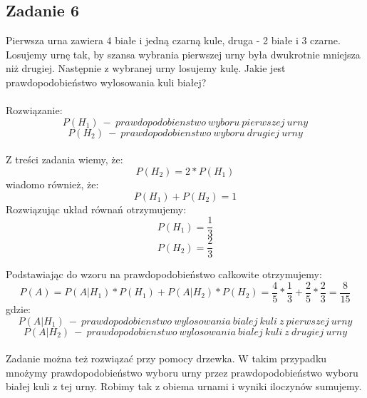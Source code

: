 \subsection{Zadanie 6}

Pierwsza urna zawiera 4 białe i jedną czarną kule, druga - 2 białe i 3 czarne.
Losujemy urnę tak, by szansa wybrania pierwszej urny była dwukrotnie mniejsza
niż drugiej. Następnie z wybranej urny losujemy kulę. Jakie jest prawdopodobieństwo
wylosowania kuli białej?\\ 
\\

Rozwiązanie:
$$
P(H_1) \ - \ prawdopodobienstwo \ wyboru \ pierwszej \ urny
$$
$$
P(H_2) \ - \ prawdopodobienstwo \ wyboru \ drugiej \ urny
$$
\\
Z treści zadania wiemy, że:
$$
 P(H_2) = 2* P(H_1)
$$
wiadomo również, że:
$$
 P(H_1) + P(H_2) =1
$$
Rozwiązując układ równań otrzymujemy:
$$
P(H_1) = \frac{1}{3}
$$
$$
P(H_2) = \frac{2}{3}
$$

Podstawiając do wzoru na prawdopodobieństwo całkowite otrzymujemy:
$$
P(A) = P(A|H_1)*P(H_1) + P(A|H_2)*P(H_2) = \frac{4}{5} * \frac{1}{3} + \frac{2}{5} * \frac{2}{3} = \frac{8}{15}
$$
gdzie:
$$
P(A|H_1) \ - \ prawdopodobienstwo \ wylosowania \ bialej \ kuli \ z \ pierwszej \ urny 
$$
$$
P(A|H_2) \ - \ prawdopodobienstwo \ wylosowania \ bialej \ kuli \ z \ drugiej \ urny 
$$
\\


Zadanie można też rozwiązać przy pomocy drzewka. W takim przypadku mnożymy
prawdopodobieństwo wyboru urny przez prawdopodobieństwo wyboru białej kuli z
tej urny. Robimy tak z obiema urnami i wyniki iloczynów sumujemy.

\begin{comment}
$$
\Tree [.Wybor\ urny [.I\\\ urna\\\ $\frac{1}{3}$ [.biała\ $\frac{4}{5}$ ] [.czarna\ $\frac{1}{5}$ ] ]
	 [.II\\\ urna\\\ $\frac{2}{3}$ [.biała\ $\frac{2}{5}$ ]
		 [.czarna\ $\frac{3}{5}$ 
			  ] ] ]
$$
\end{comment}

